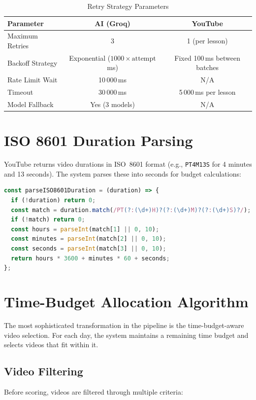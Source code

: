 \documentclass[12pt,a4paper]{report}
\begin{document}
\begin{table}[H]
\centering
\caption{Retry Strategy Parameters}
\label{tab:retry}
\begin{tabular}{l c c}
\toprule
\textbf{Parameter}       & \textbf{AI (Groq)}       & \textbf{YouTube} \\
\midrule
Maximum Retries          & 3                        & 1 (per lesson)   \\
Backoff Strategy         & Exponential ($1000 \times \text{attempt}$ ms) & Fixed 100\,ms between batches \\
Rate Limit Wait          & 10\,000\,ms              & N/A \\
Timeout                  & 30\,000\,ms              & 5\,000\,ms per lesson \\
Model Fallback           & Yes (3 models)           & N/A \\
\bottomrule
\end{tabular}
\end{table}

\section{ISO 8601 Duration Parsing}
YouTube returns video durations in ISO~8601 format (e.g., \texttt{PT4M13S} for 4 minutes and 13 seconds). The system parses these into seconds for budget calculations:

\begin{lstlisting}[language=JavaScript,caption={ISO 8601 Duration Parser},label={lst:duration-parse}]
const parseISO8601Duration = (duration) => {
  if (!duration) return 0;
  const match = duration.match(/PT(?:(\d+)H)?(?:(\d+)M)?(?:(\d+)S)?/);
  if (!match) return 0;
  const hours = parseInt(match[1] || 0, 10);
  const minutes = parseInt(match[2] || 0, 10);
  const seconds = parseInt(match[3] || 0, 10);
  return hours * 3600 + minutes * 60 + seconds;
};
\end{lstlisting}

\section{Time-Budget Allocation Algorithm}\label{sec:video-selection}
The most sophisticated transformation in the pipeline is the time-budget-aware video selection. For each day, the system maintains a remaining time budget and selects videos that fit within it.

\subsection{Video Filtering}
Before scoring, videos are filtered through multiple criteria:
\end{document}
